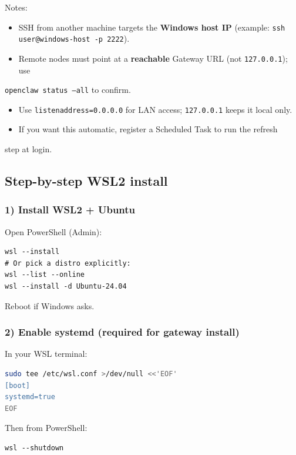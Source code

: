 Notes:

\begin{itemize}
  \item SSH from another machine targets the \textbf{Windows host IP} (example: \texttt{ssh user@windows-host -p 2222}).
  \item Remote nodes must point at a \textbf{reachable} Gateway URL (not \texttt{127.0.0.1}); use
\end{itemize}

\texttt{openclaw status --all} to confirm.
\begin{itemize}
  \item Use \texttt{listenaddress=0.0.0.0} for LAN access; \texttt{127.0.0.1} keeps it local only.
  \item If you want this automatic, register a Scheduled Task to run the refresh
\end{itemize}

step at login.

\subsection{Step-by-step WSL2 install}


\subsubsection{1) Install WSL2 + Ubuntu}


Open PowerShell (Admin):

\begin{lstlisting}
wsl --install
# Or pick a distro explicitly:
wsl --list --online
wsl --install -d Ubuntu-24.04
\end{lstlisting}


Reboot if Windows asks.

\subsubsection{2) Enable systemd (required for gateway install)}


In your WSL terminal:

\begin{lstlisting}[language=bash]
sudo tee /etc/wsl.conf >/dev/null <<'EOF'
[boot]
systemd=true
EOF
\end{lstlisting}


Then from PowerShell:

\begin{lstlisting}
wsl --shutdown
\end{lstlisting}


